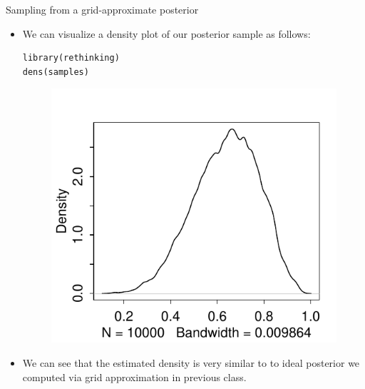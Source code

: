 \documentclass[handout]{beamer}
\begin{document}
\begin{frame}[fragile]{Sampling from a grid-approximate posterior}
\scriptsize{
\begin{itemize}

\item We can visualize a density plot of our posterior sample as follows:

\begin{verbatim}
library(rethinking)
dens(samples) 
\end{verbatim}

   \begin{figure}[h!]
	\centering
	\includegraphics[scale=0.7]{pics/posteriorTossGrid.pdf}
	\end{figure} 
 




\item We can see that the estimated density is very similar to to ideal posterior we computed via grid approximation in previous class.


 
\end{itemize}



} 

\end{frame}
\end{document}
